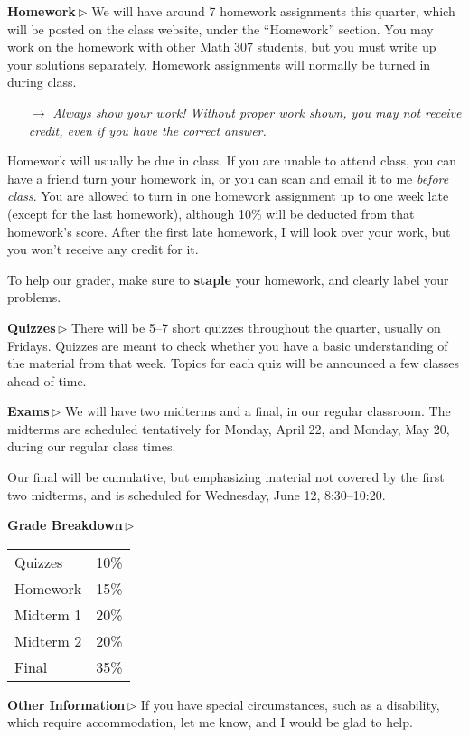 \documentclass[12pt]{letter}
\newcommand{\heading}[1]{\hspace{-0.3in}\textbf{#1}\:\,$\triangleright$\quad}  %
\newcommand{\importantnote}[1]{\vspace{-0.5em}\begin{itemize} \item[$\rightarrow$]
	\textit{#1}
\end{itemize}\vspace{-0.5em}}
\begin{document}
\heading{Homework} We will have around 7 homework assignments this quarter, which will be posted on the class website, under the ``Homework'' section. You may work on the homework with other Math 307 students, but you must write up your solutions separately. Homework assignments will normally be turned in during class.

\importantnote{Always show your work! Without proper work shown, you may not receive credit, even if you have the correct answer.}

Homework will usually be due in class. If you are unable to attend class, you can have a friend turn your homework in, or you can scan and email it to me \emph{before class}. You are allowed to turn in one homework assignment up to one week late (except for the last homework), although 10\% will be deducted from that homework's score. After the first late homework, I will look over your work, but you won't receive any credit for it.

To help our grader, make sure to \textbf{staple} your homework, and clearly label your problems.

\pagebreak

\heading{Quizzes} There will be 5--7 short quizzes throughout the quarter, usually on Fridays. Quizzes are meant to check whether you have a basic understanding of the material from that week. Topics for each quiz will be announced a few classes ahead of time. 

\heading{Exams}
We will have two midterms and a final, in our regular classroom. The midterms are scheduled tentatively for Monday, April 22, and Monday, May 20, during our regular class times.

Our final will be cumulative, but emphasizing material not covered by the first two midterms, and is scheduled for Wednesday, June 12, 8:30--10:20.

\heading{Grade Breakdown}
\begin{tabular}[t]{ll}
	Quizzes & 10\%\\
	Homework \qquad\qquad & 15\%\\
	Midterm 1 & 20\%\\
	Midterm 2 & 20\%\\
	Final & 35\%
\end{tabular}

\heading{Other Information}
If you have special circumstances, such as a disability, which require accommodation, let me know, and I would be glad to help.
\end{document}
